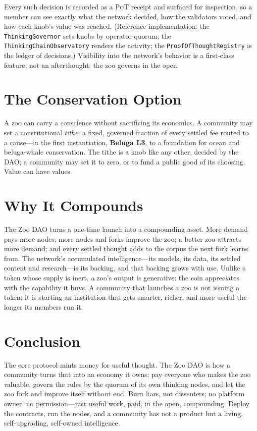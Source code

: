 \documentclass[11pt]{article}
\newcommand{\PoT}{\textsc{PoT}}
\begin{document}
Every such decision is recorded as a \PoT{} receipt and surfaced for inspection, so a member can see exactly what the network decided, how the validators voted, and how each knob's value was reached. (Reference implementation: the \texttt{ThinkingGovernor} sets knobs by operator-quorum; the \texttt{ThinkingChainObservatory} renders the activity; the \texttt{ProofOfThoughtRegistry} is the ledger of decisions.) Visibility into the network's behavior is a first-class feature, not an afterthought: the zoo governs in the open.

\section{The Conservation Option}

A zoo can carry a conscience without sacrificing its economics. A community may set a constitutional \emph{tithe}: a fixed, governed fraction of every settled fee routed to a cause---in the first instantiation, \textbf{Beluga L3}, to a foundation for ocean and beluga-whale conservation. The tithe is a knob like any other, decided by the DAO; a community may set it to zero, or to fund a public good of its choosing. Value can have values.

\section{Why It Compounds}

The Zoo DAO turns a one-time launch into a compounding asset. More demand pays more nodes; more nodes and forks improve the zoo; a better zoo attracts more demand; and every settled thought adds to the corpus the next fork learns from. The network's accumulated intelligence---its models, its data, its settled content and research---is its backing, and that backing grows with use. Unlike a token whose supply is inert, a zoo's output is generative: the coin appreciates with the capability it buys. A community that launches a zoo is not issuing a token; it is starting an institution that gets smarter, richer, and more useful the longer its members run it.

\section{Conclusion}

The core protocol mints money for useful thought. The Zoo DAO is how a community turns that into an economy it owns: pay everyone who makes the zoo valuable, govern the rules by the quorum of its own thinking nodes, and let the zoo fork and improve itself without end. Burn liars, not dissenters; no platform owner, no permission---just useful work, paid, in the open, compounding. Deploy the contracts, run the nodes, and a community has not a product but a living, self-upgrading, self-owned intelligence.
\end{document}
